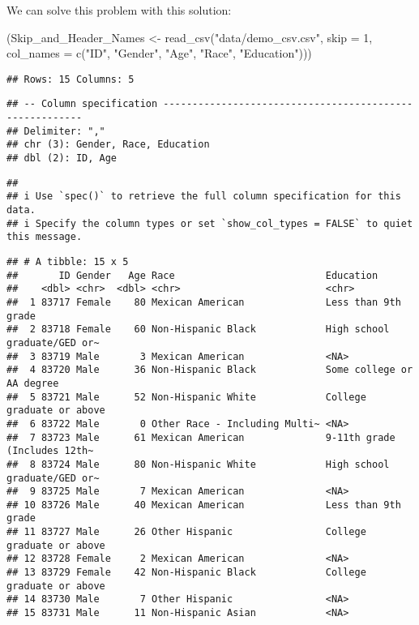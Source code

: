 \documentclass[
]{book}
\newenvironment{Shaded}{\begin{snugshade}}{\end{snugshade}}
\newcommand{\AttributeTok}[1]{\textcolor[rgb]{0.77,0.63,0.00}{#1}}
\newcommand{\DecValTok}[1]{\textcolor[rgb]{0.00,0.00,0.81}{#1}}
\newcommand{\FunctionTok}[1]{\textcolor[rgb]{0.00,0.00,0.00}{#1}}
\newcommand{\NormalTok}[1]{#1}
\newcommand{\OtherTok}[1]{\textcolor[rgb]{0.56,0.35,0.01}{#1}}
\newcommand{\StringTok}[1]{\textcolor[rgb]{0.31,0.60,0.02}{#1}}
\begin{document}
We can solve this problem with this solution:

\begin{Shaded}
\begin{Highlighting}[]
\NormalTok{(Skip\_and\_Header\_Names }\OtherTok{\textless{}{-}} \FunctionTok{read\_csv}\NormalTok{(}\StringTok{"data/demo\_csv.csv"}\NormalTok{, }
                                  \AttributeTok{skip =} \DecValTok{1}\NormalTok{,}
                                  \AttributeTok{col\_names =} \FunctionTok{c}\NormalTok{(}\StringTok{"ID"}\NormalTok{, }\StringTok{"Gender"}\NormalTok{, }\StringTok{"Age"}\NormalTok{, }\StringTok{"Race"}\NormalTok{, }\StringTok{"Education"}\NormalTok{)))}
\end{Highlighting}
\end{Shaded}

\begin{verbatim}
## Rows: 15 Columns: 5
\end{verbatim}

\begin{verbatim}
## -- Column specification --------------------------------------------------------
## Delimiter: ","
## chr (3): Gender, Race, Education
## dbl (2): ID, Age
\end{verbatim}

\begin{verbatim}
## 
## i Use `spec()` to retrieve the full column specification for this data.
## i Specify the column types or set `show_col_types = FALSE` to quiet this message.
\end{verbatim}

\begin{verbatim}
## # A tibble: 15 x 5
##       ID Gender   Age Race                          Education                   
##    <dbl> <chr>  <dbl> <chr>                         <chr>                       
##  1 83717 Female    80 Mexican American              Less than 9th grade         
##  2 83718 Female    60 Non-Hispanic Black            High school graduate/GED or~
##  3 83719 Male       3 Mexican American              <NA>                        
##  4 83720 Male      36 Non-Hispanic Black            Some college or AA degree   
##  5 83721 Male      52 Non-Hispanic White            College graduate or above   
##  6 83722 Male       0 Other Race - Including Multi~ <NA>                        
##  7 83723 Male      61 Mexican American              9-11th grade (Includes 12th~
##  8 83724 Male      80 Non-Hispanic White            High school graduate/GED or~
##  9 83725 Male       7 Mexican American              <NA>                        
## 10 83726 Male      40 Mexican American              Less than 9th grade         
## 11 83727 Male      26 Other Hispanic                College graduate or above   
## 12 83728 Female     2 Mexican American              <NA>                        
## 13 83729 Female    42 Non-Hispanic Black            College graduate or above   
## 14 83730 Male       7 Other Hispanic                <NA>                        
## 15 83731 Male      11 Non-Hispanic Asian            <NA>
\end{verbatim}
\end{document}
